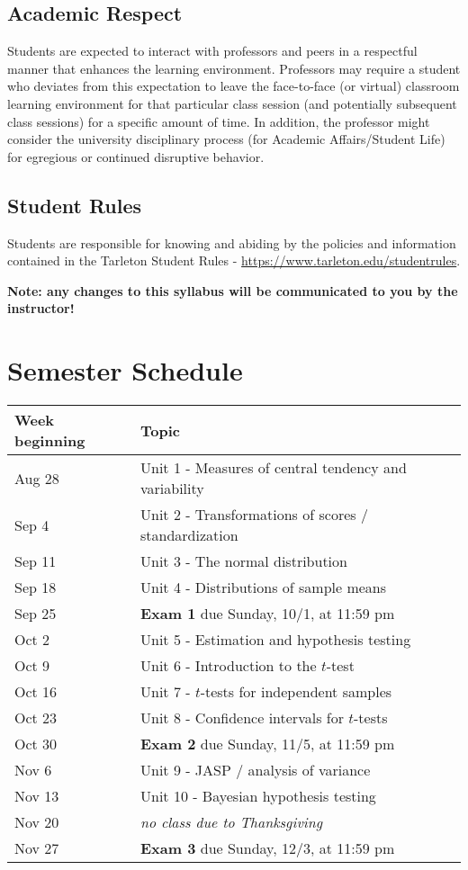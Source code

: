\documentclass[10pt]{article}
\begin{document}
\subsection*{Academic Respect}
\label{sec:org7606e26}
Students are expected to interact with professors and peers in a respectful manner that enhances the learning environment. Professors may require a student who deviates from this expectation to leave the face-to-face (or virtual) classroom learning environment for that particular class session (and potentially subsequent class sessions) for a specific amount of time. In addition, the professor might consider the university disciplinary process (for Academic Affairs/Student Life) for egregious or continued disruptive behavior.


\subsection*{Student Rules}
\label{sec:org64769b1}
Students are responsible for knowing and abiding by the policies and information contained in the Tarleton Student Rules - \url{https://www.tarleton.edu/studentrules}.  

\textbf{Note:  any changes to this syllabus will be communicated to you by the instructor!}

\section*{Semester Schedule}
\label{sec:orgc567b9e}

\begin{center}
\begin{tabular}{ll}
Week beginning & Topic\\
\hline
Aug 28 & Unit 1 - Measures of central tendency and variability\\
Sep 4 & Unit 2 - Transformations of scores / standardization\\
Sep 11 & Unit 3 - The normal distribution\\
Sep 18 & Unit 4 - Distributions of sample means\\
Sep 25 & \textbf{Exam 1} due Sunday, 10/1, at 11:59 pm\\
Oct 2 & Unit 5 - Estimation and hypothesis testing\\
Oct 9 & Unit 6 - Introduction to the \(t\)-test\\
Oct 16 & Unit 7 - \(t\)-tests for independent samples\\
Oct 23 & Unit 8 - Confidence intervals for \(t\)-tests\\
Oct 30 & \textbf{Exam 2} due Sunday, 11/5, at 11:59 pm\\
Nov 6 & Unit 9 - JASP / analysis of variance\\
Nov 13 & Unit 10 - Bayesian hypothesis testing\\
Nov 20 & \emph{no class due to Thanksgiving}\\
Nov 27 & \textbf{Exam 3} due Sunday, 12/3, at 11:59 pm\\
\end{tabular}
\end{center}
\end{document}

